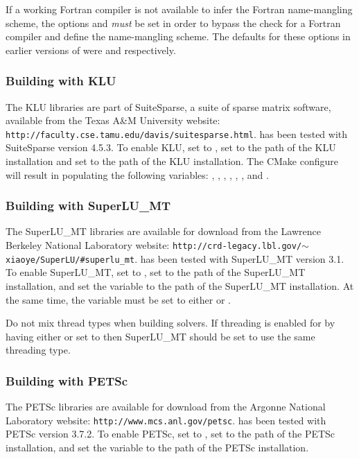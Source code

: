 If a working Fortran compiler is not available to infer the Fortran
name-mangling scheme, the options  and
 \textit{must} be set in order to
bypass the check for a Fortran compiler and define the name-mangling
scheme. The defaults for these options in earlier versions of
{\sundials} were  and  respectively.

\subsubsection*{Building with KLU}
The KLU libraries are part of SuiteSparse, a suite of sparse matrix software,
available from the Texas A\&M University website: {\tt http://faculty.cse.tamu.edu/davis/suitesparse.html}.
{\sundials} has been tested with SuiteSparse version 4.5.3.
To enable KLU, set  to , set  to the 
path of the KLU installation and set  to the  path of the KLU installation.
The CMake configure will result in populating the following variables: ,
, , ,
, , and
\newline{}.

\subsubsection*{Building with SuperLU\_MT}
The SuperLU\_MT libraries are available for download from the Lawrence Berkeley National Laboratory website:
{\tt http://crd-legacy.lbl.gov/$\sim$xiaoye/SuperLU/\#superlu\_mt}. 
{\sundials} has been tested with SuperLU\_MT version 3.1. 
To enable SuperLU\_MT, set   to , set 
to the  path of the SuperLU\_MT installation, and set the variable
\newline{} to the  path of the SuperLU\_MT installation.
At the same time, the variable
 must be set to either  or .

\noindent Do not mix thread types when building {\sundials} solvers.
If threading is enabled for {\sundials} by having either  or  set to 
then SuperLU\_MT should be set to use the same threading type.{\warn}

\subsubsection*{Building with PETSc}
The PETSc libraries are available for download from the Argonne National Laboratory website:
{\tt http://www.mcs.anl.gov/petsc}. 
{\sundials} has been tested with PETSc version 3.7.2. 
To enable PETSc, set   to , set 
to the  path of the PETSc installation, and set the variable
 to the  path of the PETSc installation.


